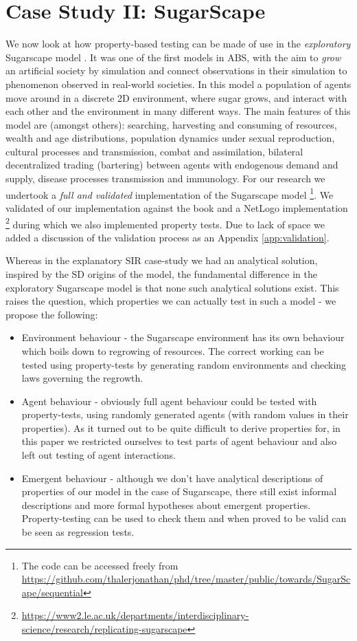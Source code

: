 \section{Case Study II: SugarScape}
\label{sec:case_sug}

We now look at how property-based testing can be made of use in the \textit{exploratory} Sugarscape model \cite{epstein_growing_1996}. It was one of the first models in ABS, with the aim to \textit{grow} an artificial society by simulation and connect observations in their simulation to phenomenon observed in real-world societies. In this model a population of agents move around in a discrete 2D environment, where sugar grows, and interact with each other and the environment in many different ways. The main features of this model are (amongst others): searching, harvesting and consuming of resources, wealth and age distributions, population dynamics under sexual reproduction, cultural processes and transmission, combat and assimilation, bilateral decentralized trading (bartering) between agents with endogenous demand and supply, disease processes transmission and immunology. For our research we undertook a \textit{full and validated} implementation of the Sugarscape model \footnote{The code can be accessed freely from \url{https://github.com/thalerjonathan/phd/tree/master/public/towards/SugarScape/sequential}}. We validated of our implementation against the book \cite{epstein_growing_1996} and a NetLogo implementation \cite{weaver_replicating_2009} \footnote{\url{https://www2.le.ac.uk/departments/interdisciplinary-science/research/replicating-sugarscape}} during which we also implemented property tests. Due to lack of space we added a discussion of the validation process as an Appendix \ref{app:validation}.

Whereas in the explanatory SIR case-study we had an analytical solution, inspired by the SD origins of the model, the fundamental difference in the exploratory Sugarscape model is that none such analytical solutions exist. This raises the question, which properties we can actually test in such a model - we propose the following:
\begin{itemize}
	\item Environment behaviour - the Sugarscape environment has its own behaviour which boils down to regrowing of resources. The correct working can be tested using property-tests by generating random environments and checking laws governing the regrowth.
	\item Agent behaviour - obviously full agent behaviour could be tested with property-tests, using randomly generated agents (with random values in their properties). As it turned out to be quite difficult to derive properties for, in this paper we restricted ourselves to test parts of agent behaviour and also left out testing of agent interactions.
	\item Emergent behaviour - although we don't have analytical descriptions of properties of our model in the case of Sugarscape, there still exist informal descriptions and more formal hypotheses about emergent properties. Property-testing can be used to check them and when proved to be valid can be seen as regression tests.
\end{itemize}


